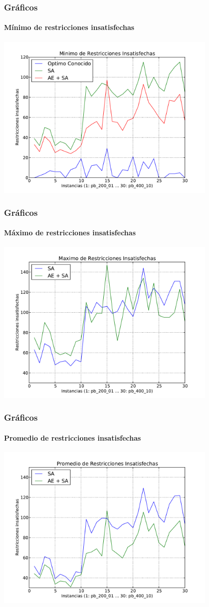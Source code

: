 \frame
{
\frametitle{Gráficos}
\framesubtitle{Mínimo de restricciones insatisfechas}
\begin{center}
	\includegraphics[width=0.8\textwidth]{img/min}
\end{center}
}
\frame
{
\frametitle{Gráficos}
\framesubtitle{Máximo de restricciones insatisfechas}
\begin{center}
	\includegraphics[width=0.8\textwidth]{img/max}
\end{center}
}
\frame
{
\frametitle{Gráficos}
\framesubtitle{Promedio de restricciones insatisfechas}
\begin{center}
	\includegraphics[width=0.8\textwidth]{img/prom}
\end{center}
}
